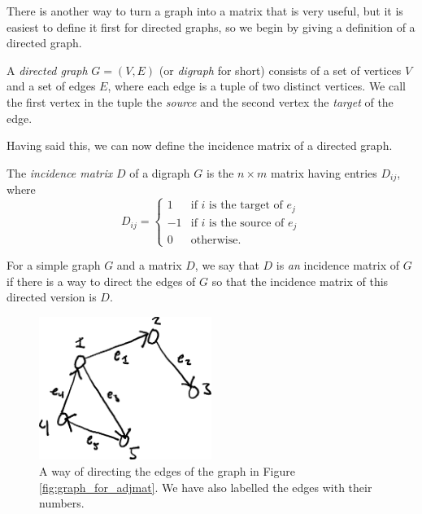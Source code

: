 \documentclass[nobib]{tufte-handout}
\begin{document}
There is another way to turn a graph into a matrix that is very useful, but it is easiest to define it first for directed graphs, so we begin by giving a definition of a directed graph.

\begin{definition}
    A \emph{directed graph} $G = (V,E)$ (or \emph{digraph} for short) consists of a set of vertices $V$ and a set of edges $E$, where each edge is a tuple of two distinct vertices. We call the first vertex in the tuple the \emph{source} and the second vertex the \emph{target} of the edge.
\end{definition}

Having said this, we can now define the incidence matrix of a directed graph.

\begin{definition}
    The \emph{incidence matrix} $D$ of a digraph $G$ is the $n\times m$ matrix having entries $D_{ij}$, where
    \begin{equation*}
        D_{ij} = \begin{cases}
            1 &\text{if } i \text{ is the target of } e_j\\
            -1 &\text{if } i \text{ is the source of } e_j\\
            0 &\text{otherwise.}
        \end{cases}
    \end{equation*}

    For a simple graph $G$ and a matrix $D$, we say that $D$ is \emph{an} incidence matrix of $G$ if there is a way to direct the edges of $G$ so that the incidence matrix of this directed version is $D$.
\end{definition}

\begin{figure}
    \centering
    \includegraphics[width=0.5\textwidth]{graphics/L4_spectral/digraph_for_incmat.png}
    \caption{A way of directing the edges of the graph in Figure \ref{fig:graph_for_adjmat}. We have also labelled the edges with their numbers.}
    \label{fig:digraph_for_incmat}
\end{figure}
\end{document}

